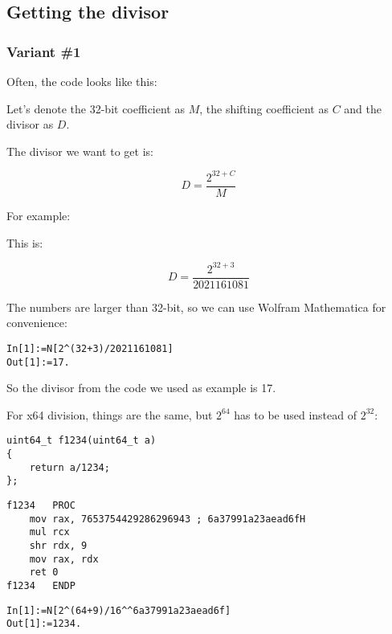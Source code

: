 ﻿\subsection{Getting the divisor}

\subsubsection{Variant \#1}

Often, the code looks like this:



Let's denote the 32-bit  coefficient as $M$, the shifting coefficient as $C$ and the divisor as $D$.

The divisor we want to get is:

\[
D=\frac{2^{32 + C}}{M}
\]

For example:



This is:

\[
D=\frac{2^{32 + 3}}{2021161081}
\]


The numbers are larger than 32-bit, so we can use Wolfram Mathematica for convenience:

\begin{lstlisting}[caption=Wolfram Mathematica]
In[1]:=N[2^(32+3)/2021161081]
Out[1]:=17.
\end{lstlisting}

So the divisor from the code we used as example is 17.

For x64 division, things 
are the same, but $2^{64}$ has to be used instead of $2^{32}$:

\begin{lstlisting}
uint64_t f1234(uint64_t a)
{
	return a/1234;
};
\end{lstlisting}

\begin{lstlisting}[caption=\Optimizing MSVC 2012 x64]
f1234	PROC
	mov	rax, 7653754429286296943 ; 6a37991a23aead6fH
	mul	rcx
	shr	rdx, 9
	mov	rax, rdx
	ret	0
f1234	ENDP
\end{lstlisting}

\begin{lstlisting}[caption=Wolfram Mathematica]
In[1]:=N[2^(64+9)/16^^6a37991a23aead6f]
Out[1]:=1234.
\end{lstlisting}

